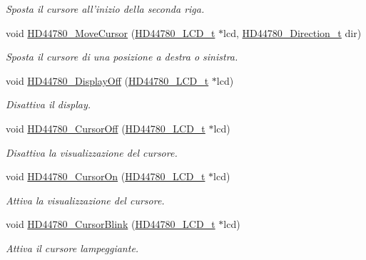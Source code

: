 \begin{DoxyCompactItemize}
\begin{DoxyCompactList}\small\item\em Sposta il cursore all'inizio della seconda riga. \end{DoxyCompactList}\item 
void \hyperlink{group___l_c_d_gabcea9a03050c46530e39b7556c673baf}{H\+D44780\+\_\+\+Move\+Cursor} (\hyperlink{struct_h_d44780___l_c_d__t}{H\+D44780\+\_\+\+L\+C\+D\+\_\+t} $\ast$lcd, \hyperlink{group___l_c_d_gaf46f4db4f981d3a1088804a6d6980d30}{H\+D44780\+\_\+\+Direction\+\_\+t} dir)
\begin{DoxyCompactList}\small\item\em Sposta il cursore di una posizione a destra o sinistra. \end{DoxyCompactList}\item 
void \hyperlink{group___l_c_d_ga5cf07b2179272029410f9a81f56621ed}{H\+D44780\+\_\+\+Display\+Off} (\hyperlink{struct_h_d44780___l_c_d__t}{H\+D44780\+\_\+\+L\+C\+D\+\_\+t} $\ast$lcd)
\begin{DoxyCompactList}\small\item\em Disattiva il display. \end{DoxyCompactList}\item 
void \hyperlink{group___l_c_d_ga56421dc398825188aa10257063a3ee4b}{H\+D44780\+\_\+\+Cursor\+Off} (\hyperlink{struct_h_d44780___l_c_d__t}{H\+D44780\+\_\+\+L\+C\+D\+\_\+t} $\ast$lcd)
\begin{DoxyCompactList}\small\item\em Disattiva la visualizzazione del cursore. \end{DoxyCompactList}\item 
void \hyperlink{group___l_c_d_ga3a381cb44df5d76d79be5ed71a52bae6}{H\+D44780\+\_\+\+Cursor\+On} (\hyperlink{struct_h_d44780___l_c_d__t}{H\+D44780\+\_\+\+L\+C\+D\+\_\+t} $\ast$lcd)
\begin{DoxyCompactList}\small\item\em Attiva la visualizzazione del cursore. \end{DoxyCompactList}\item 
void \hyperlink{group___l_c_d_ga92eb58cb7d73c9a87b7087a9c56f73d5}{H\+D44780\+\_\+\+Cursor\+Blink} (\hyperlink{struct_h_d44780___l_c_d__t}{H\+D44780\+\_\+\+L\+C\+D\+\_\+t} $\ast$lcd)
\begin{DoxyCompactList}\small\item\em Attiva il cursore lampeggiante. \end{DoxyCompactList}\end{DoxyCompactItemize}


